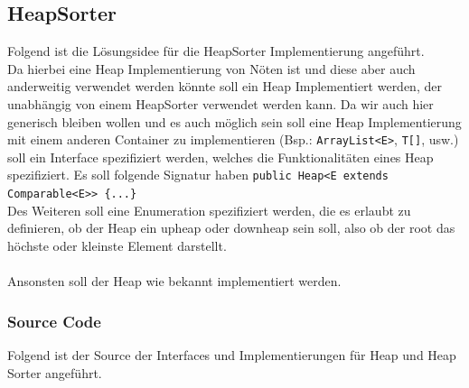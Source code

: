 \documentclass[11pt, a4paper, twoside]{article}   	%
\newcommand{\srcDir}{../src/main/java}
\newcommand{\mainPackage}{\srcDir/at/fhooe/swe4/lab3}
\newcommand{\inlinecode}{\lstinline[style=inlineSource]}
\begin{document}
\newpage
\subsection{HeapSorter}
Folgend ist die Lösungsidee für die HeapSorter Implementierung angeführt.\\
Da hierbei eine Heap Implementierung von Nöten ist und diese aber auch anderweitig verwendet werden könnte soll ein Heap Implementiert werden, der unabhängig von einem HeapSorter verwendet werden kann. Da wir auch hier generisch bleiben wollen und es auch möglich sein soll eine Heap Implementierung mit einem anderen Container zu implementieren (Bsp.: \inlinecode{ArrayList<E>}, \inlinecode{T[]}, usw.) soll ein Interface spezifiziert werden, welches die Funktionalitäten eines Heap spezifiziert. Es soll folgende Signatur haben
\inlinecode|public Heap<E extends Comparable<E>> {...}|\\
Des Weiteren soll eine Enumeration spezifiziert werden, die es erlaubt zu definieren, ob der Heap ein upheap oder downheap sein soll, also ob der root das höchste oder kleinste Element darstellt.\\\\
Ansonsten soll der Heap wie bekannt implementiert werden.
\subsubsection{Source Code}
Folgend ist der Source der Interfaces und Implementierungen für Heap und Heap Sorter angeführt.



\newpage
\end{document}
